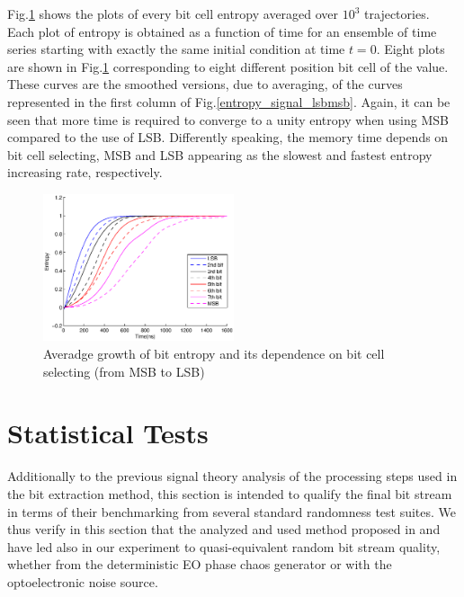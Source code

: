 Fig.\ref{lsb2msb_entropy} shows the plots of every bit cell entropy
averaged over $10^3$ trajectories.  Each plot of entropy is obtained
as a function of time for an ensemble of time series starting with
exactly the same initial condition at time $t = 0$. Eight plots are
shown in Fig.\ref{lsb2msb_entropy} corresponding to eight different
position bit cell of the value. These curves are the smoothed
versions, due to averaging, of the curves represented in the first
column of Fig.\ref{entropy_signal_lsbmsb}. Again, it can be seen that
more time is required to converge to a unity entropy when using MSB
compared to the use of LSB. Differently speaking, the memory time
depends on bit cell selecting, MSB and LSB appearing as the slowest
and fastest entropy increasing rate, respectively.

%
\begin{figure}[h]
  \centering
  \includegraphics[width=0.5\textwidth]{lsb2msb_entropy.eps}
  \caption{Averadge growth of bit entropy and its dependence on bit
    cell selecting (from MSB to LSB)}
  \label{lsb2msb_entropy}
\end{figure}


\section{Statistical Tests}
\label{comparison}
%
Additionally to the previous signal theory analysis of the processing
steps used in the bit extraction method, this section is intended to
qualify the final bit stream in terms of their benchmarking from
several standard randomness test suites. We thus verify in this
section that the analyzed and used method proposed in
\cite{ultrafast2009} and \cite{ultrafast2010} have led also in our
experiment to quasi-equivalent random bit stream quality, whether from
the deterministic EO phase chaos generator or with the optoelectronic
noise source.
%
%
%
